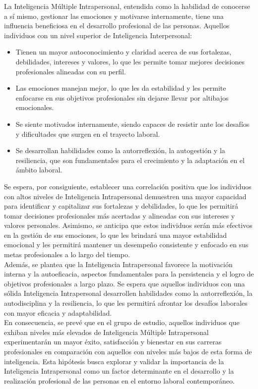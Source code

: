 La Inteligencia Múltiple Intrapersonal, entendida como la habilidad de conocerse a sí mismo, gestionar las emociones y motivarse internamente, tiene una influencia beneficiosa en el desarrollo profesional de las personas. Aquellos individuos con un nivel superior de Inteligencia Interpersonal:
\begin{itemize}
\item Tienen un mayor autoconocimiento y claridad acerca de sus fortalezas, debilidades, intereses y valores, lo que les permite tomar mejores decisiones profesionales alineadas con su perfil.
\item Las emociones manejan mejor, lo que les da estabilidad y les permite enfocarse en sus objetivos profesionales sin dejarse llevar por altibajos emocionales.
\item Se siente motivados internamente, siendo capaces de resistir ante los desafíos y dificultades que surgen en el trayecto laboral.
\item Se desarrollan habilidades como la autorreflexión, la autogestión y la resiliencia, que son fundamentales para el crecimiento y la adaptación en el ámbito laboral.
\end{itemize}

Se espera, por consiguiente, establecer una correlación positiva que los individuos con altos niveles de Inteligencia Intrapersonal demuestren una mayor capacidad para identificar y capitalizar sus fortalezas y debilidades, lo que les permitirá tomar decisiones profesionales más acertadas y alineadas con sus intereses y valores personales. Asimismo, se anticipa que estos individuos serán más efectivos en la gestión de sus emociones, lo que les brindará una mayor estabilidad emocional y les permitirá mantener un desempeño consistente y enfocado en sus metas profesionales a lo largo del tiempo.\\
Además, se plantea que la Inteligencia Intrapersonal favorece la motivación interna y la autoeficacia, aspectos fundamentales para la persistencia y el logro de objetivos profesionales a largo plazo. Se espera que aquellos individuos con una sólida Inteligencia Intrapersonal desarrollen habilidades como la autorreflexión, la autodisciplina y la resiliencia, lo que les permitirá afrontar los desafíos laborales con mayor eficacia y adaptabilidad.\\
En consecuencia, se prevé que en el grupo de estudio, aquellos individuos que exhiban niveles más elevados de Inteligencia Múltiple Intrapersonal experimentarán un mayor éxito, satisfacción y bienestar en sus carreras profesionales en comparación con aquellos con niveles más bajos de esta forma de inteligencia. Esta hipótesis busca explorar y validar la importancia de la Inteligencia Intrapersonal como un factor determinante en el desarrollo y la realización profesional de las personas en el entorno laboral contemporáneo.

